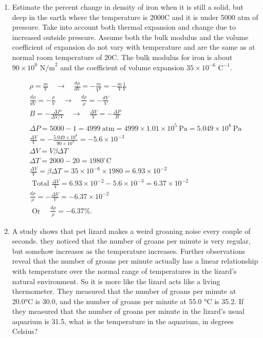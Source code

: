 \documentclass{zc-ust-hw}
\begin{document}
\begin{enumerate}
  \item Estimate the percent change in density of iron when it is still a
    solid, but deep in the earth where the temperature is 2000\textdegree C and it is
    under 5000 atm of pressure. Take into account both thermal expansion and
    change due to increased outside pressure. Assume both the bulk modulus and
    the volume coefficient of expansion do not vary with temperature and are
    the same as at normal room temperature of 20\textdegree C. The bulk modulus for iron
    is about \(90\times 10^{9}\text{ N/m}^2\) and the coefficient of volume expansion \(35\times 10^{-6}\text{ C}^{-1}\).   
    \begin{sol}
      \begin{gather}
        \rho=\frac{m}{V} \quad \rightarrow \quad \frac{d \rho}{d V}=-\frac{m}{V^2}=-\frac{m}{V} \frac{1}{V} \\
        \frac{d \rho}{d V}=-\frac{\rho}{V} \quad \rightarrow \quad \frac{d \rho}{\rho}=-\frac{d V}{V} \\
        B=-\frac{\Delta P}{\Delta V / V} \quad \rightarrow \quad \frac{\Delta V}{V}=-\frac{\Delta P}{B} \\
        \Delta P=5000-1=4999 \mathrm{~atm}=4999 \times 1.01 \times 10^5 \mathrm{~Pa}=5.049 \times 10^8 \mathrm{~Pa} \\
        \frac{\Delta V}{V}=-\frac{5.049 \times 10^8}{90 \times 10^9}=-5.6 \times 10^{-3} \\
        \Delta V=V \beta \Delta T \\
        \Delta T=2000-20=1980^{\circ} \mathrm{C} \\
        \frac{\Delta V}{V}=\beta \Delta T=35 \times 10^{-6} \times 1980=6.93 \times 10^{-2} \\
        \text { Total } \frac{\Delta V}{V}=6.93 \times 10^{-2}-5.6 \times 10^{-3}=6.37 \times 10^{-2} \\
        \frac{d \rho}{\rho}=-\frac{\Delta V}{V}=-6.37 \times 10^{-2} \\
        \text { Or } \quad \frac{d \rho}{\rho}=-6.37 \%
      .\end{gather}
    \end{sol}

  \item A study shows that pet lizard makes a weird groaning noise every couple
    of seconds. they noticed that the number of groans per minute is very
    regular, but somehow increases as the temperature increases. Further
    observations reveal that the number of groans per minute actually has a
    linear relationship with temperature over the normal range of temperatures
    in the lizard's natural environment. So it is more like the lizard acts
    like a living thermometer. They measured that the number of groans per
    minute at 20.0°C is 30.0, and the number of groans per minute at 55.0 °C is
    35.2. If they measured that the number of groans per minute in the lizard's
    usual aquarium is 31.5, what is the temperature in the aquarium, in degrees
    Celsius?


\end{enumerate}
\end{document}
